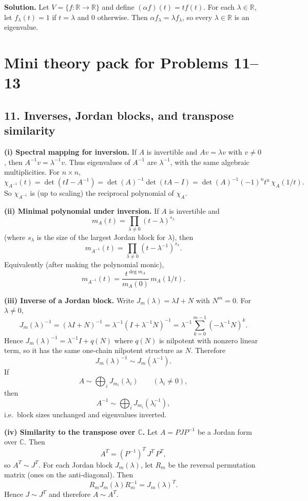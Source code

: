 \documentclass[12pt,a4paper]{article}
\theoremstyle{plain}
\theoremstyle{definition}      %
\begin{document}
\textbf{Solution.}
Let $V=\{f:\mathbb R\to\mathbb R\}$ and define $(\alpha f)(t)=t f(t)$.
For each $\lambda\in\mathbb R$, let $f_\lambda(t)=1$ if $t=\lambda$ and $0$ otherwise.
Then $\alpha f_\lambda=\lambda f_\lambda$, so every $\lambda\in\mathbb R$ is an eigenvalue.

\section*{Mini theory pack for Problems 11--13}

\subsection*{11. Inverses, Jordan blocks, and transpose similarity}

\textbf{(i) Spectral mapping for inversion.}
If $A$ is invertible and $Av=\lambda v$ with $v\neq 0$, then $A^{-1}v=\lambda^{-1}v$.
Thus eigenvalues of $A^{-1}$ are $\lambda^{-1}$, with the same algebraic multiplicities.
For $n\times n$,
\[
\chi_{A^{-1}}(t)=\det(tI-A^{-1})
=\det(A)^{-1}\det(tA-I)
=\det(A)^{-1}(-1)^n t^n\,\chi_A(1/t).
\]
So $\chi_{A^{-1}}$ is (up to scaling) the reciprocal polynomial of $\chi_A$.

\textbf{(ii) Minimal polynomial under inversion.}
If $A$ is invertible and
\[
m_A(t)=\prod_{\lambda\neq 0}(t-\lambda)^{s_\lambda}
\]
(where $s_\lambda$ is the size of the largest Jordan block for $\lambda$),
then
\[
m_{A^{-1}}(t)=\prod_{\lambda\neq 0}(t-\lambda^{-1})^{s_\lambda}.
\]
Equivalently (after making the polynomial monic),
\[
m_{A^{-1}}(t)=\frac{t^{\deg m_A}}{m_A(0)}\,m_A(1/t).
\]

\textbf{(iii) Inverse of a Jordan block.}
Write $J_m(\lambda)=\lambda I+N$ with $N^m=0$. For $\lambda\neq 0$,
\[
J_m(\lambda)^{-1}
=(\lambda I+N)^{-1}
=\lambda^{-1}(I+\lambda^{-1}N)^{-1}
=\lambda^{-1}\sum_{k=0}^{m-1}(-\lambda^{-1}N)^k.
\]
Hence $J_m(\lambda)^{-1}=\lambda^{-1}I+q(N)$ where $q(N)$ is nilpotent with nonzero linear term,
so it has the same one-chain nilpotent structure as $N$. Therefore
\[
J_m(\lambda)^{-1}\sim J_m(\lambda^{-1}).
\]
If
\[
A\sim \bigoplus_i J_{m_i}(\lambda_i)\qquad(\lambda_i\neq 0),
\]
then
\[
A^{-1}\sim \bigoplus_i J_{m_i}(\lambda_i^{-1}),
\]
i.e.\ block sizes unchanged and eigenvalues inverted.

\textbf{(iv) Similarity to the transpose over $\mathbb C$.}
Let $A=PJP^{-1}$ be a Jordan form over $\mathbb C$. Then
\[
A^T=(P^{-1})^T\,J^T\,P^T,
\]
so $A^T\sim J^T$.
For each Jordan block $J_m(\lambda)$, let $R_m$ be the reversal permutation matrix (ones on the anti-diagonal).
Then
\[
R_m J_m(\lambda) R_m^{-1}=J_m(\lambda)^T.
\]
Hence $J\sim J^T$ and therefore $A\sim A^T$.
\end{document}
